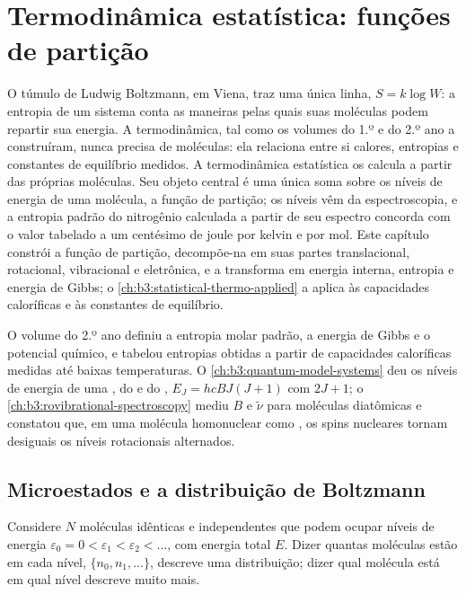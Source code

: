 \chapter{Termodinâmica estatística: funções de partição}\label{ch:b3:partition-functions}

O túmulo de Ludwig Boltzmann, em Viena, traz uma única linha, $S = k\log W$: a
entropia de um sistema conta as maneiras pelas quais suas moléculas podem
repartir sua energia. A termodinâmica, tal como os volumes do 1.º e do 2.º ano
a construíram, nunca precisa de moléculas: ela relaciona entre si calores,
entropias e constantes de equilíbrio medidos. A termodinâmica estatística os
calcula a partir das próprias moléculas. Seu objeto central é uma única soma
sobre os níveis de energia de uma molécula, a função de partição; os níveis
vêm da espectroscopia, e a entropia padrão do nitrogênio calculada a partir de
seu espectro concorda com o valor tabelado a um centésimo de joule por kelvin
e por mol. Este capítulo constrói a função de partição, decompõe-na em suas
partes translacional, rotacional, vibracional e eletrônica, e a transforma em
energia interna, entropia e energia de Gibbs; o
\cref{ch:b3:statistical-thermo-applied} a aplica às capacidades caloríficas e
às constantes de equilíbrio.

\begin{recall}
O volume do 2.º ano definiu a entropia molar padrão, a energia de Gibbs e o
potencial químico, e tabelou entropias obtidas a partir de capacidades
caloríficas medidas até baixas temperaturas. O \cref{ch:b3:quantum-model-systems}
deu os níveis de energia de uma , do  e do
, $E_J = hcBJ(J+1)$ com  $2J + 1$; o
\cref{ch:b3:rovibrational-spectroscopy} mediu $B$ e $\tilde\nu$ para moléculas
diatômicas e constatou que, em uma molécula homonuclear como , os spins
nucleares tornam desiguais os níveis rotacionais alternados.
\end{recall}

\section{Microestados e a distribuição de Boltzmann}

Considere $N$ moléculas idênticas e independentes que podem ocupar níveis de
energia $\varepsilon_0 = 0 < \varepsilon_1 < \varepsilon_2 < \dots$, com energia total $E$. Dizer
quantas moléculas estão em cada nível, $\{n_0, n_1, \dots\}$, descreve uma
distribuição; dizer qual molécula está em qual nível descreve muito mais.


